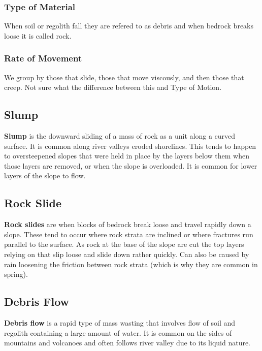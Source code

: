 \documentclass{article}
\begin{document}
\subsubsection{Type of Material} %
\label{ssub:type_of_material}
When soil or regolith fall they are refered to as debris and when bedrock breaks loose it is called rock.

\subsubsection{Rate of Movement} %
\label{ssub:rate_of_movement}
We group by those that slide, those that move viscously, and then those that creep. Not sure what the difference between this and Type of Motion.

\subsection{Slump} %
\label{sub:slump}
\textbf{Slump} is the downward sliding of a mass of rock as a unit along a curved surface. It is common along river valleys eroded shorelines. This tends to happen to oversteepened slopes that were held in place by the layers below them when those layers are removed, or when the slope is overloaded. It is common for lower layers of the slope to flow.

\subsection{Rock Slide} %
\label{sub:rock_slide}
\textbf{Rock slides} are when blocks of bedrock break loose and travel rapidly down a slope. These tend to occur where rock strata are inclined or where fractures run parallel to the surface. As rock at the base of the slope are cut the top layers relying on that slip loose and slide down rather quickly. Can also be caused by rain loosening the friction between rock strata (which is why they are common in spring).

\subsection{Debris Flow} %
\label{sub:debris_flow}
\textbf{Debris flow} is a rapid type of mass wasting that involves flow of soil and regolith containing a large amount of water. It is common on the sides of mountains and volcanoes and often follows river valley due to its liquid nature.
\end{document}
